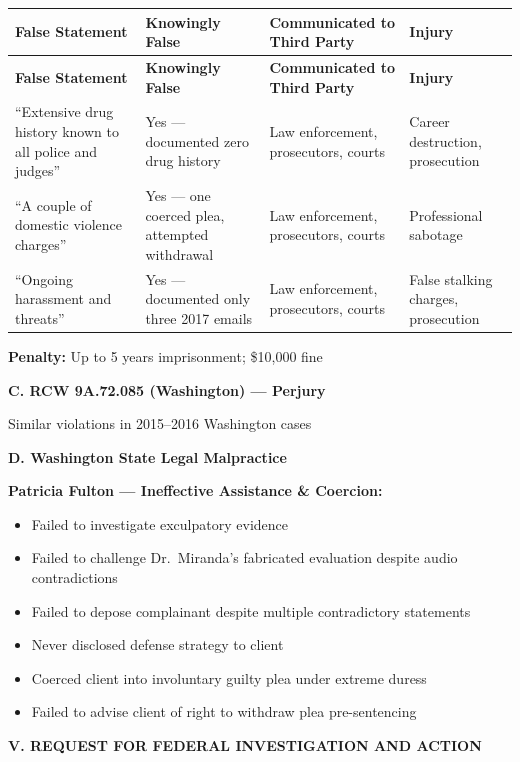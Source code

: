 \documentclass[11pt, letterpaper]{article}
\newcommand{\sectiontitle}[1]{\vspace{0.2in}\noindent\textcolor{NavyBlue}{\large\textbf{#1}}\vspace{0.1in}}
\newcommand{\subsectiontitle}[1]{\vspace{0.15in}\noindent\textcolor{NavyBlue}{\textbf{#1}}\vspace{0.05in}}
\begin{document}
\begin{center}
\begin{longtable}{|p{1.5in}|p{1.2in}|p{1.2in}|p{1.3in}|}
\hline
\textbf{False Statement} & \textbf{Knowingly False} & \textbf{Communicated to Third Party} & \textbf{Injury} \\
\hline
\endfirsthead
\hline
\textbf{False Statement} & \textbf{Knowingly False} & \textbf{Communicated to Third Party} & \textbf{Injury} \\
\hline
\endhead
``Extensive drug history known to all police and judges'' & Yes --- documented zero drug history & Law enforcement, prosecutors, courts & Career destruction, prosecution \\
\hline
``A couple of domestic violence charges'' & Yes --- one coerced plea, attempted withdrawal & Law enforcement, prosecutors, courts & Professional sabotage \\
\hline
``Ongoing harassment and threats'' & Yes --- documented only three 2017 emails & Law enforcement, prosecutors, courts & False stalking charges, prosecution \\
\hline
\end{longtable}
\end{center}

\textbf{Penalty:} Up to 5 years imprisonment; \$10,000 fine

\subsectiontitle{C. RCW 9A.72.085 (Washington) --- Perjury}

Similar violations in 2015--2016 Washington cases

\subsectiontitle{D. Washington State Legal Malpractice}

\textbf{Patricia Fulton --- Ineffective Assistance \& Coercion:}
\begin{itemize}[leftmargin=*,itemsep=2pt]
    \item Failed to investigate exculpatory evidence
    \item Failed to challenge Dr.\ Miranda's fabricated evaluation despite audio contradictions
    \item Failed to depose complainant despite multiple contradictory statements
    \item Never disclosed defense strategy to client
    \item Coerced client into involuntary guilty plea under extreme duress
    \item Failed to advise client of right to withdraw plea pre-sentencing
\end{itemize}

\sectiontitle{V. REQUEST FOR FEDERAL INVESTIGATION AND ACTION}
\end{document}
